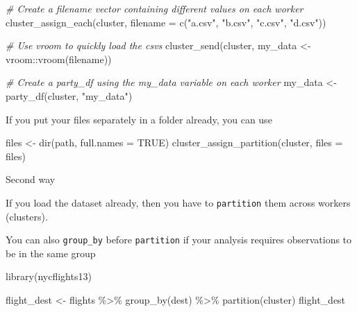 \documentclass[
]{book}
\newenvironment{Shaded}{\begin{snugshade}}{\end{snugshade}}
\newcommand{\AttributeTok}[1]{\textcolor[rgb]{0.77,0.63,0.00}{#1}}
\newcommand{\CommentTok}[1]{\textcolor[rgb]{0.56,0.35,0.01}{\textit{#1}}}
\newcommand{\ConstantTok}[1]{\textcolor[rgb]{0.00,0.00,0.00}{#1}}
\newcommand{\FunctionTok}[1]{\textcolor[rgb]{0.00,0.00,0.00}{#1}}
\newcommand{\NormalTok}[1]{#1}
\newcommand{\OtherTok}[1]{\textcolor[rgb]{0.56,0.35,0.01}{#1}}
\newcommand{\SpecialCharTok}[1]{\textcolor[rgb]{0.00,0.00,0.00}{#1}}
\newcommand{\StringTok}[1]{\textcolor[rgb]{0.31,0.60,0.02}{#1}}
\begin{document}
\begin{Shaded}
\begin{Highlighting}[]
\CommentTok{\# Create a filename vector containing different values on each worker}
\FunctionTok{cluster\_assign\_each}\NormalTok{(cluster, }\AttributeTok{filename =} \FunctionTok{c}\NormalTok{(}\StringTok{"a.csv"}\NormalTok{, }\StringTok{"b.csv"}\NormalTok{, }\StringTok{"c.csv"}\NormalTok{, }\StringTok{"d.csv"}\NormalTok{))}

\CommentTok{\# Use vroom to quickly load the csvs}
\FunctionTok{cluster\_send}\NormalTok{(cluster, my\_data }\OtherTok{\textless{}{-}}\NormalTok{ vroom}\SpecialCharTok{::}\FunctionTok{vroom}\NormalTok{(filename))}

\CommentTok{\# Create a party\_df using the my\_data variable on each worker}
\NormalTok{my\_data }\OtherTok{\textless{}{-}} \FunctionTok{party\_df}\NormalTok{(cluster, }\StringTok{"my\_data"}\NormalTok{)}
\end{Highlighting}
\end{Shaded}

If you put your files separately in a folder already, you can use

\begin{Shaded}
\begin{Highlighting}[]
\NormalTok{files }\OtherTok{\textless{}{-}} \FunctionTok{dir}\NormalTok{(path, }\AttributeTok{full.names =} \ConstantTok{TRUE}\NormalTok{)}
\FunctionTok{cluster\_assign\_partition}\NormalTok{(cluster, }\AttributeTok{files =}\NormalTok{ files)}
\end{Highlighting}
\end{Shaded}

Second way

If you load the dataset already, then you have to \texttt{partition} them across workers (clusters).

You can also \texttt{group\_by} before \texttt{partition} if your analysis requires observations to be in the same group

\begin{Shaded}
\begin{Highlighting}[]
\FunctionTok{library}\NormalTok{(nycflights13)}

\NormalTok{flight\_dest }\OtherTok{\textless{}{-}}\NormalTok{ flights }\SpecialCharTok{\%\textgreater{}\%} \FunctionTok{group\_by}\NormalTok{(dest) }\SpecialCharTok{\%\textgreater{}\%} \FunctionTok{partition}\NormalTok{(cluster)}
\NormalTok{flight\_dest}
\end{Highlighting}
\end{Shaded}
\end{document}
